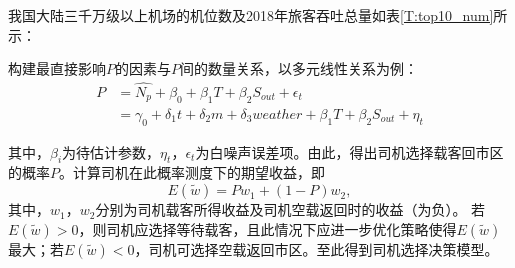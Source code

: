 我国大陆三千万级以上机场的机位数及2018年旅客吞吐总量如表\ref{T:top10_num}所示：

\begin{table}
    \centering
    \caption{中国大陆三千万级机场机位数及年旅客吞吐量}\label{T:top10_num}
\end{table}

 构建最直接影响$P$的因素与$P$间的数量关系，以多元线性关系为例：
 \begin{equation}\label{eq:linmodel}
    \begin{aligned}
        P &= \hat{N_p} + \beta_0 + \beta_1T + \beta_2S_{out} + \epsilon_t \\
          &= \gamma_0 + \delta_1t + \delta_2m + \delta_3weather + \beta_1T + \beta_2S_{out} + \eta_t
    \end{aligned}
\end{equation}

其中，$\beta_i$为待估计参数，$\eta_t$，$\epsilon_t$为白噪声误差项。由此，得出司机选择载客回市区的概率$P$。计算司机在此概率测度下的期望收益，即
\[
    E(\tilde{w}) = Pw_1 + (1-P)w_2,
\]
其中，$w_1$，$w_2$分别为司机载客所得收益及司机空载返回时的收益（为负）。
若$E(\tilde{w})>0$，则司机应选择等待载客，且此情况下应进一步优化策略使得$E(\tilde{w})$最大；若$E(\tilde{w})<0$，司机可选择空载返回市区。至此得到司机选择决策模型。
